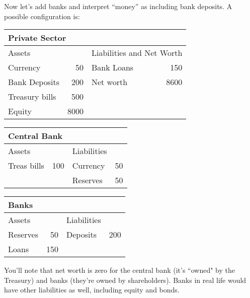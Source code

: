 \documentclass[letterpaper,12pt]{article}
\begin{document}
Now let's add banks and interpret ``money'' as including bank deposits.
A possible configuration is:
%
\begin{center}
\begin{tabular}{lr|lr}
\multicolumn{4}{l}{Private Sector}         \\
\hline
            Assets                &&
                        \multicolumn{2}{l}{Liabilities and Net Worth}   \\
\hline
            Currency        &    50   &   Bank Loans &    150          \\
            Bank Deposits   &   200   &   Net worth  &   8600          \\
            Treasury bills  &   500   &                                \\
            Equity          &  8000   &                                \\
\end{tabular}
\end{center}
%
\begin{center}
\begin{tabular}{lr|lr}
\multicolumn{4}{l}{Central Bank}               \\
\hline
                    Assets      &&          Liabilities        \\
\hline
                    Treas bills & 100    &  Currency   & 50    \\
                                &        &  Reserves   & 50    \\
\end{tabular}
\end{center}
%
\begin{center}
\begin{tabular}{lr|lr}
\multicolumn{4}{l}{Banks}             \\
\hline
                    Assets      &&          Liabilities        \\
\hline                     Reserves    &  50    &  Deposits   &200    \\
                    Loans       & 150    &             &       \\
\end{tabular}
\end{center}
%
You'll note that net worth is zero for the central bank
(it's ``owned" by the Treasury) and banks (they're owned by shareholders).
Banks in real life would have other liabilities as well,
including equity and bonds.
\end{document}
